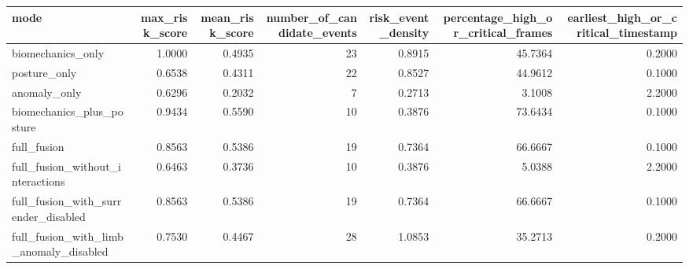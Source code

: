 \begin{tabular}{lrrrrrr}
\toprule
mode & max\_risk\_score & mean\_risk\_score & number\_of\_candidate\_events & risk\_event\_density & percentage\_high\_or\_critical\_frames & earliest\_high\_or\_critical\_timestamp \\
\midrule
biomechanics\_only & 1.0000 & 0.4935 & 23 & 0.8915 & 45.7364 & 0.2000 \\
posture\_only & 0.6538 & 0.4311 & 22 & 0.8527 & 44.9612 & 0.1000 \\
anomaly\_only & 0.6296 & 0.2032 & 7 & 0.2713 & 3.1008 & 2.2000 \\
biomechanics\_plus\_posture & 0.9434 & 0.5590 & 10 & 0.3876 & 73.6434 & 0.1000 \\
full\_fusion & 0.8563 & 0.5386 & 19 & 0.7364 & 66.6667 & 0.1000 \\
full\_fusion\_without\_interactions & 0.6463 & 0.3736 & 10 & 0.3876 & 5.0388 & 2.2000 \\
full\_fusion\_with\_surrender\_disabled & 0.8563 & 0.5386 & 19 & 0.7364 & 66.6667 & 0.1000 \\
full\_fusion\_with\_limb\_anomaly\_disabled & 0.7530 & 0.4467 & 28 & 1.0853 & 35.2713 & 0.2000 \\
\bottomrule
\end{tabular}
